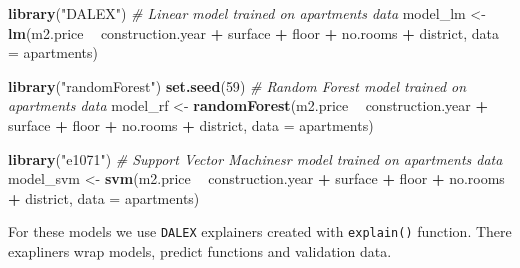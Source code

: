 \documentclass[]{book}
\newenvironment{Shaded}{\begin{snugshade}}{\end{snugshade}}
\newcommand{\CommentTok}[1]{\textcolor[rgb]{0.56,0.35,0.01}{\textit{#1}}}
\newcommand{\DataTypeTok}[1]{\textcolor[rgb]{0.13,0.29,0.53}{#1}}
\newcommand{\DecValTok}[1]{\textcolor[rgb]{0.00,0.00,0.81}{#1}}
\newcommand{\KeywordTok}[1]{\textcolor[rgb]{0.13,0.29,0.53}{\textbf{#1}}}
\newcommand{\NormalTok}[1]{#1}
\newcommand{\OperatorTok}[1]{\textcolor[rgb]{0.81,0.36,0.00}{\textbf{#1}}}
\newcommand{\StringTok}[1]{\textcolor[rgb]{0.31,0.60,0.02}{#1}}
\theoremstyle{definition}
\theoremstyle{definition}
\theoremstyle{definition}
\theoremstyle{remark}
\begin{document}
\begin{Shaded}
\begin{Highlighting}[]
\KeywordTok{library}\NormalTok{(}\StringTok{"DALEX"}\NormalTok{)}
\CommentTok{# Linear model trained on apartments data}
\NormalTok{model_lm <-}\StringTok{ }\KeywordTok{lm}\NormalTok{(m2.price }\OperatorTok{~}\StringTok{ }\NormalTok{construction.year }\OperatorTok{+}\StringTok{ }\NormalTok{surface }\OperatorTok{+}\StringTok{ }\NormalTok{floor }\OperatorTok{+}\StringTok{ }
\StringTok{                      }\NormalTok{no.rooms }\OperatorTok{+}\StringTok{ }\NormalTok{district, }\DataTypeTok{data =}\NormalTok{ apartments)}

\KeywordTok{library}\NormalTok{(}\StringTok{"randomForest"}\NormalTok{)}
\KeywordTok{set.seed}\NormalTok{(}\DecValTok{59}\NormalTok{)}
\CommentTok{# Random Forest model trained on apartments data}
\NormalTok{model_rf <-}\StringTok{ }\KeywordTok{randomForest}\NormalTok{(m2.price }\OperatorTok{~}\StringTok{ }\NormalTok{construction.year }\OperatorTok{+}\StringTok{ }\NormalTok{surface }\OperatorTok{+}\StringTok{ }\NormalTok{floor }\OperatorTok{+}\StringTok{ }
\StringTok{                      }\NormalTok{no.rooms }\OperatorTok{+}\StringTok{ }\NormalTok{district, }\DataTypeTok{data =}\NormalTok{ apartments)}

\KeywordTok{library}\NormalTok{(}\StringTok{"e1071"}\NormalTok{)}
\CommentTok{# Support Vector Machinesr model trained on apartments data}
\NormalTok{model_svm <-}\StringTok{ }\KeywordTok{svm}\NormalTok{(m2.price }\OperatorTok{~}\StringTok{ }\NormalTok{construction.year }\OperatorTok{+}\StringTok{ }\NormalTok{surface }\OperatorTok{+}\StringTok{ }\NormalTok{floor }\OperatorTok{+}\StringTok{ }
\StringTok{                         }\NormalTok{no.rooms }\OperatorTok{+}\StringTok{ }\NormalTok{district, }\DataTypeTok{data =}\NormalTok{ apartments)}
\end{Highlighting}
\end{Shaded}

For these models we use \texttt{DALEX} explainers created with
\texttt{explain()} function. There exapliners wrap models, predict
functions and validation data.

\begin{Shaded}
\end{Shaded}
\end{document}
